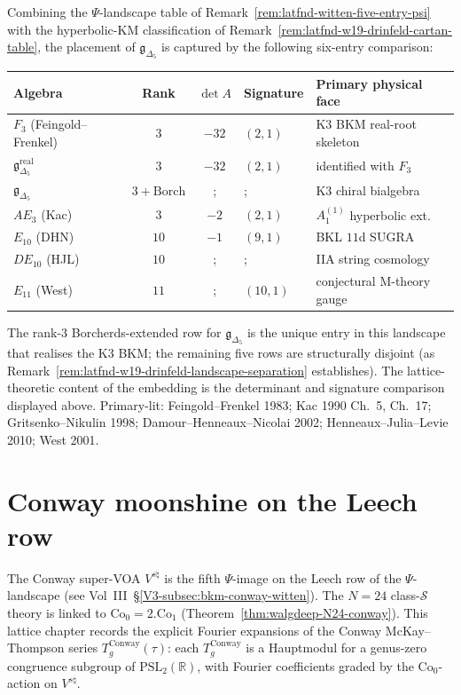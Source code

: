 \begin{remark}
\label{rem:latfnd-w19-drinfeld-full-landscape-table}
Combining the $\Psi$-landscape table of
Remark~\ref{rem:latfnd-witten-five-entry-psi} with the
hyperbolic-KM classification of
Remark~\ref{rem:latfnd-w19-drinfeld-cartan-table}, the
placement of $\mathfrak{g}_{\Delta_5}$ is captured by the
following six-entry comparison:
\begin{center}
\renewcommand{\arraystretch}{1.25}
\begin{tabular}{@{}lccll@{}}
\toprule
Algebra & Rank & $\det A$ & Signature & Primary physical face \\
\midrule
$F_3$ (Feingold--Frenkel) & $3$ & $-32$ & $(2,1)$ & K3 BKM real-root skeleton \\
$\mathfrak{g}_{\Delta_5}^{\mathrm{real}}$ & $3$ & $-32$ & $(2,1)$ & identified with $F_3$ \\
$\mathfrak{g}_{\Delta_5}$ & $3\!+\!\mathrm{Borch}$ &; &; & K3 chiral bialgebra \\
$AE_3$ (Kac) & $3$ & $-2$ & $(2,1)$ & $A_1^{(1)}$ hyperbolic ext.\\
$E_{10}$ (DHN) & $10$ & $-1$ & $(9,1)$ & BKL $11$d SUGRA \\
$DE_{10}$ (HJL) & $10$ &; &; & IIA string cosmology \\
$E_{11}$ (West) & $11$ &; & $(10,1)$ & conjectural M-theory gauge \\
\bottomrule
\end{tabular}
\end{center}
The rank-$3$ Borcherds-extended row for $\mathfrak{g}_{\Delta_5}$ is
the unique entry in this landscape that realises the K3 BKM; the
remaining five rows are structurally disjoint (as
Remark~\ref{rem:latfnd-w19-drinfeld-landscape-separation}
establishes). The lattice-theoretic content of the embedding is
the determinant and signature comparison displayed above. Primary-lit:
Feingold--Frenkel 1983;
Kac 1990 Ch.~5, Ch.~17; Gritsenko--Nikulin 1998;
Damour--Henneaux--Nicolai 2002; Henneaux--Julia--Levie 2010;
West 2001.
\end{remark}

\section{Conway moonshine on the Leech row}
\label{sec:latfnd-conway-moonshine}

The Conway super-VOA $V^{s\natural}$ is the fifth $\Psi$-image on
the Leech row of the $\Psi$-landscape
(see Vol~III~\S\ref{V3-subsec:bkm-conway-witten}). The $N = 24$
class-$\mathcal{S}$ theory is linked to
$\mathrm{Co}_0 = 2.\mathrm{Co}_1$
(Theorem~\ref{thm:walgdeep-N24-conway}). This lattice chapter records
the explicit Fourier expansions
of the Conway McKay--Thompson series
$T_g^{\mathrm{Conway}}(\tau)$: each
$T_g^{\mathrm{Conway}}$ is a Hauptmodul for a genus-zero congruence
subgroup of $\mathrm{PSL}_2(\mathbb{R})$, with Fourier coefficients
graded by the $\mathrm{Co}_0$-action on $V^{s\natural}$.

